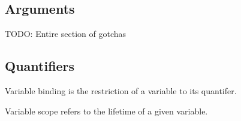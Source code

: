\documentclass{article}
\begin{document}


\subsection{Arguments}



TODO: Entire section of gotchas

\subsection{Quantifiers}



Variable binding is the restriction of a variable to its quantifer.

Variable scope refers to the lifetime of a given variable.



    
\end{document}
